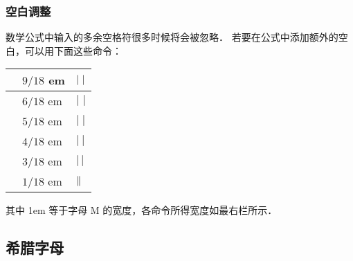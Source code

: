 \documentclass[12pt,notheorems,xcolor={rgb}]{beamer}
\newenvironment{framex}{\begin{frame}[fragile=singleslide,environment=framex]}{\end{frame}}
\def\bold#1{\textcolor{accent2}{#1}}
\def\demo#1{\textcolor{accent3}{#1}}
\newcommand\zz[1]{\text{\bold{\string#1}}}
\begin{document}
\begin{framex}
\frametitle{空白调整}\label{space}
数学公式中输入的多余空格符很多时候将会被忽略．
若要在公式中添加额外的空白，可以用下面这些命令：\par
\renewcommand{\arraystretch}{1.2}
\begin{tabularx}{\textwidth}{XXX}
  \hline
  \zz{\ensp}     & $9/18$ em & \demo{$|\!\mkern9mu|$} \\
  \hline
  \zz{\vthicksp} & $6/18$ em & \demo{$|\!\,\,|$} \\
  \hline
  \zz{\thicksp}  & $5/18$ em & \demo{$|\!\;|$} \\
  \hline
  \zz{\medsp}    & $4/18$ em & \demo{$|\!\:|$} \\
  \hline
  \zz{\thinsp}   & $3/18$ em & \demo{$|\!\,|$} \\
  \hline
  \zz{\hairsp}   & $1/18$ em & \demo{$|\!\mkern1mu|$} \\
  \hline
\end{tabularx}\par
其中  1em 等于字母 M 的宽度，各命令所得宽度如最右栏所示．
\end{framex}

\subsection{希腊字母}
\end{document}
